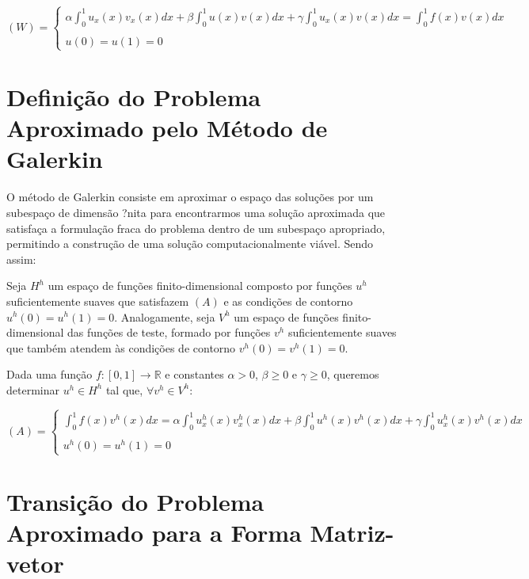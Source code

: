  \begin{center}
    $(W) = \begin{cases}
      \displaystyle\alpha \int^{1}_{0} u_{x}(x)v_{x}(x) dx + \beta \int^{1}_{0} u(x)v(x) dx + \gamma \int^{1}_{0} u_{x}(x)v(x) dx = \int^{1}_{0} f(x)v(x) dx \\
      \\
      u(0) = u(1) = 0
    \end{cases}$
  \end{center}

\section{Definição do Problema Aproximado pelo Método de Galerkin}

O método de Galerkin consiste em aproximar o espaço das soluções por um subespaço de dimensão ?nita para encontrarmos uma solução aproximada que satisfaça a formulação fraca do problema dentro de um subespaço apropriado, permitindo a construção de uma solução computacionalmente viável. Sendo assim:

Seja $H^h$ um espaço de funções finito-dimensional composto por funções $u^h$ suficientemente suaves que satisfazem $(A)$ e as condições de contorno $u^h(0) = u^h(1) = 0$. Analogamente, seja $V^h$ um espaço de funções finito-dimensional das funções de teste, formado por funções $v^h$ suficientemente suaves que também atendem às condições de contorno $v^h(0) = v^h(1) = 0$.

Dada uma função $f : [0,1] \to \mathbb{R}$ e constantes $\alpha > 0$, $\beta \geq 0$ e $\gamma \geq 0$, queremos determinar $u^h \in H^h$ tal que, $\forall v^h \in V^h$:

\begin{center}
  $ (A) = \begin{cases}
    \displaystyle\int^{1}_{0} f(x)v^{h}(x) dx = \alpha \int^{1}_{0} u^{h}_{x}(x)v^{h}_{x}(x) dx + \beta \int^{1}_{0} u^{h}(x)v^{h}(x) dx + \gamma \int^{1}_{0} u^{h}_{x}(x)v^{h}(x) dx \\
    \\
    u^h(0) = u^h(1) = 0
  \end{cases}$
\end{center}

\section{Transição do Problema Aproximado para a Forma Matriz-vetor}

